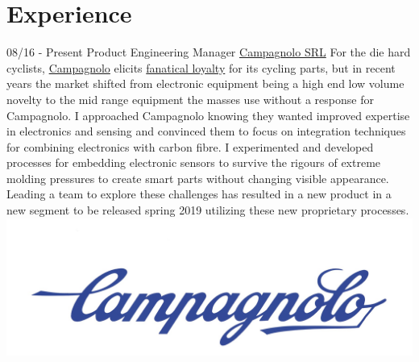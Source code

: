 \documentclass[]{friggeri-cv}
\begin{document}
\section{Experience}
\begin{entrylist}
  \wentry
	{08/16 - Present}
	{Product Engineering Manager}
	{\href{https://www.campagnolo.com}{Campagnolo SRL}}
	{For the die hard cyclists, \href{https://www.campagnolo.com}{Campagnolo} elicits  \href{https://www.google.ca/search?q=campagnolo+tattoo&source=lnms&tbm=isch&sa=X&ved=0ahUKEwj34N_d0MreAhVqqVQKHd3IDLQQ_AUIDigB&biw=1742&bih=850}{fanatical loyalty} for its cycling parts, but in recent years the market shifted from electronic equipment being a high end low volume novelty to the mid range equipment the masses use without a response for Campagnolo. I approached Campagnolo knowing they wanted improved expertise in electronics and sensing and convinced them to focus on integration techniques for combining electronics with carbon fibre. I experimented and developed processes for embedding electronic sensors to survive the rigours of extreme molding pressures to create smart parts without changing visible appearance. Leading a team to explore these challenges has resulted in a new product in a new segment to be released spring 2019 utilizing these new proprietary processes.}
	{\includegraphics[scale=0.050]{img/campa_logo.jpg} }


\end{entrylist}
\end{document}
